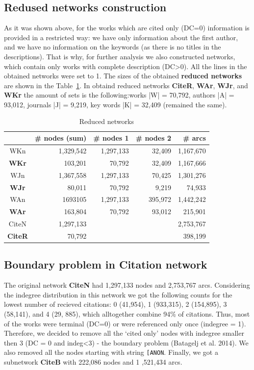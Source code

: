 \documentclass[11pt]{article} %
\begin{document}
\subsection{Redused networks construction}

As it was shown above, for the works which are cited only (DC=0) information is provided in a restricted way: we have only information about the first author, and we have no information on the keywords (as there is no titles in the descriptions). That is why, for further analysis we also constructed networks, which contain only works with complete description (DC>0). All the lines in the obtained networks were set to 1. The sizes of the obtained \textbf {reduced networks} are shown in the Table~\ref{rednet}. In obtaind reduced networks \textbf{CiteR}, \textbf{WAr}, \textbf{WJr}, and \textbf{WKr} the amount of sets is the following:works |W| = 70,792, authors |A| = 93,012, journals |J| = 9,219, key words |K| = 32,409 (remained the same).\medskip 

\begin{table}
\caption{Reduced networks}\label{rednet}\medskip
\begin{center}
\begin{tabular}{c|r|r|r|r}
	&\# nodes (sum)	& \# nodes 1	&\# nodes 2	& \# arcs \\ \hline		 
WKn &  	1,329,542	& 1,297,133	& 32,409	& 1,167,670 \\
\textbf{WKr}	& 103,201	& 70,792	& 32,409	& 1,167,666 \\ \hline	
WJn & 	1,367,558	& 1,297,133	& 70,425	& 1,301,276 \\ 
\textbf{WJr} 	& 80,011	& 70,792	& 9,219	& 74,933 \\ \hline	
WAn	& 1693105	& 1,297,133	& 395,972	& 1,442,242 \\ 
\textbf{WAr}	& 163,804	& 70,792	& 93,012	& 215,901 \\ \hline	
CiteN & 1,297,133 & & & 2,753,767\\ 
\textbf{CiteR} & 70,792 & & & 398,199 \\ \hline
\end{tabular}				
\end{center}
\end{table}

\subsection{Boundary problem in Citation network}

The original network \textbf{CiteN} had 1,297,133 nodes and 2,753,767 arcs. Considering the indegree distribution in this network we got the following  counts for the lowest number of recieved citations: 0 (41,954), 1 (933,315), 2 (154,895), 3 (58,141), and 4 (29, 885), which alltogether  combine 94\% of citations. Thus, most of the works were terminal (DC=0) or were referenced only once (indegree = 1). Therefore, we decided to remove all the `cited only' nodes with indegree smaller then 3 (DC = 0 and indeg<3) - the boundary problem (Batagelj et al. 2014). We also removed all the nodes starting with string \texttt{[ANON}.  Finally, we got a subnetwork \textbf{CiteB} with  222,086 nodes and 1 ,521,434 arcs.
			
\end{document}
